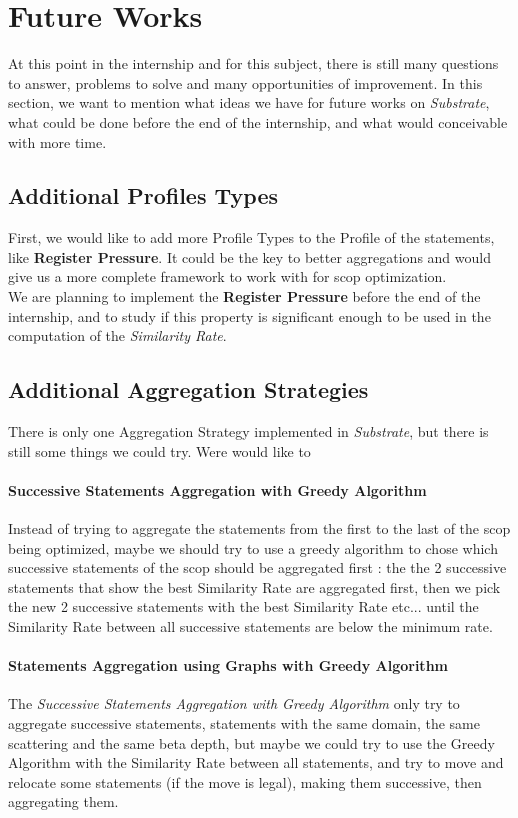 \documentclass[paper=a4, fontsize=11pt]{scrartcl}
\numberwithin{equation}{section}        %
\numberwithin{figure}{section}          %
\numberwithin{table}{section}               %
\begin{document}
\section{Future Works}
\label{sec:future_works}
At this point in the internship and for this subject, there is still many
questions to answer, problems to solve and many opportunities of improvement.
In this section, we want to mention what ideas we have for future works on \textit{Substrate},
what could be done before the end of the internship, and what would conceivable with more time.
    \subsection{Additional Profiles Types}
        First, we would like to add more Profile Types to the Profile of the statements,
        like \textbf{Register Pressure}. It could be the key to better aggregations and would
        give us a more complete framework to work with for scop optimization.\\

        We are planning to implement the \textbf{Register Pressure} before the end of the
        internship, and to study if this property is significant enough to be used in the
        computation of the \textit{Similarity Rate}.
    \subsection{Additional Aggregation Strategies}
        There is only one Aggregation Strategy implemented in \textit{Substrate}, but
        there is still some things we could try. Were would like to 
        \paragraph{Successive Statements Aggregation with Greedy Algorithm}
            Instead of trying to aggregate the statements from the first to the last
            of the scop being optimized, maybe we should try to use a greedy algorithm
            to chose which successive statements of the scop should be aggregated first : the
            the 2 successive statements that show the best Similarity Rate are aggregated
            first, then we pick the new 2 successive statements with the best Similarity Rate etc...
            until the Similarity Rate between all successive statements are below the minimum rate.\\
        \paragraph{Statements Aggregation using Graphs with Greedy Algorithm}
            The \textit{Successive Statements Aggregation with Greedy Algorithm} only
            try to aggregate successive statements, statements with the same domain,
            the same scattering and the same beta depth, but maybe we could try to
            use the Greedy Algorithm with the Similarity Rate between all statements,
            and try to move and relocate some statements (if the move is legal),
            making them successive, then aggregating them.
\end{document}
